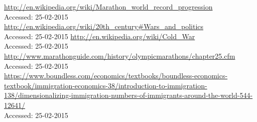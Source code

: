 \documentclass[11pt,a4paper]{article}
\begin{document}
\newpage
\begin{thebibliography}{4}
  \url{http://en.wikipedia.org/wiki/Marathon_world_record_progression}\\
  {Accessed: 25-02-2015}
  \url{http://en.wikipedia.org/wiki/20th_century#Wars_and_politics}\\
  {Accessed: 25-02-2015}
  \url{http://en.wikipedia.org/wiki/Cold_War}\\
  {Accessed: 25-02-2015}
  \url{http://www.marathonguide.com/history/olympicmarathons/chapter25.cfm}\\
  {Accessed: 25-02-2015}
  \url{ https://www.boundless.com/economics/textbooks/boundless-economics-textbook/immigration-economics-38/introduction-to-immigration-138/dimensionalizing-immigration-numbers-of-immigrants-around-the-world-544-12641/}\\
  {Accessed: 25-02-2015}
 

\end{thebibliography}
\end{document}
